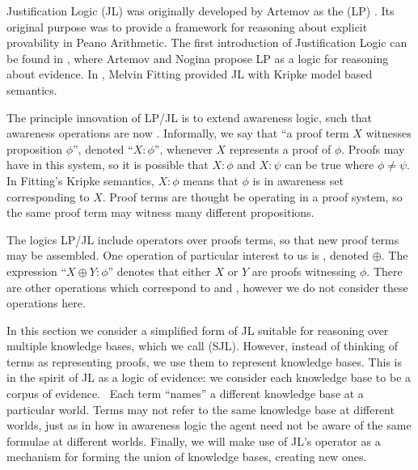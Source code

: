 Justification Logic (JL) was originally developed by Artemov as the
 (LP) {\cite{artemov_logic_1994}}.  Its original
purpose was to provide a framework for reasoning about explicit provability in
Peano Arithmetic.  The first introduction of Justification Logic can be found
in {\cite{artemov_introducing_2005}}, where Artemov and Nogina propose LP as a
logic for reasoning about evidence.  In {\cite{fitting_logic_2005}}, Melvin
Fitting provided JL with Kripke model based semantics.

The principle innovation of LP/JL is to extend awareness logic, such that
awareness operations are now .  Informally, we say that
``a proof term $X$ witnesses proposition $\phi$'', denoted ``$X : \phi$'',
whenever $X$ represents a proof of $\phi$.  Proofs may have
{} in this system, so it is possible that $X :
\phi$ and $X : \psi$ can be true where $\phi \neq \psi$.  In Fitting's Kripke
semantics, $X : \phi$ means that $\phi$ is in awareness set corresponding to
$X$.  Proof terms are thought be operating in a 
proof system, so the same proof term may witness many different propositions.



The logics LP/JL include operators over proofs terms, so that new proof terms
may be assembled.  One operation of particular interest to us is
{}, denoted $\oplus$.  The expression ``$X \oplus Y : \phi$''
denotes that either $X$ or $Y$ are proofs witnessing $\phi$.  There are other
operations which correspond to  and
, however we do not consider these
operations here.



In this section we consider a simplified form of JL suitable for reasoning
over multiple knowledge bases, which we call  (SJL). However, instead of thinking of terms as representing proofs, we
use them to represent knowledge bases. This is in the spirit of JL as a logic
of evidence: we consider each knowledge base to be a corpus of evidence. \
Each term ``names'' a different knowledge base at a particular world.  Terms
may not refer to the same knowledge base at different worlds, just as in how
in awareness logic the agent need not be aware of the same formulae at
different worlds.  Finally, we will make use of JL's {\tmem{choice}} operator
as a mechanism for forming the union of knowledge bases, creating new ones.

